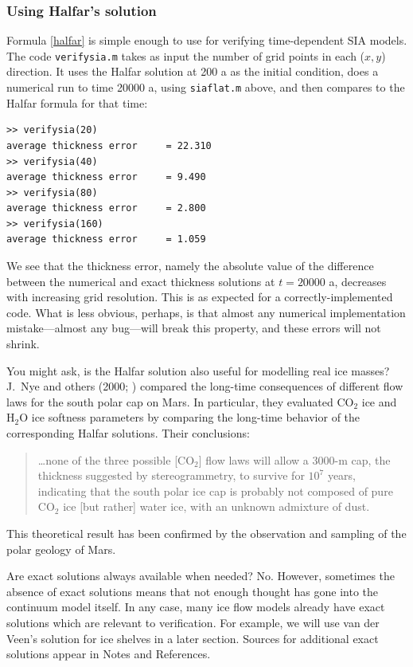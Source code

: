 \documentclass[letterpaper,final,12pt,reqno]{amsart}
\begin{document}
\subsubsection*{Using Halfar's solution}  Formula \eqref{halfar} is simple enough to use for verifying time-dependent SIA models.  The code \texttt{verifysia.m} takes as input the number of grid points in each ($x,y$) direction.  It uses the Halfar solution at 200 a as the initial condition, does a numerical run to time 20000 a, using \texttt{siaflat.m} above, and then compares to the Halfar formula for that time:
\small
\begin{verbatim}
>> verifysia(20)
average thickness error     = 22.310
>> verifysia(40)
average thickness error     = 9.490
>> verifysia(80)
average thickness error     = 2.800
>> verifysia(160)
average thickness error     = 1.059
\end{verbatim}
\normalsize
We see that the thickness error, namely the absolute value of the difference between the numerical and exact thickness solutions at $t=20000$ a, decreases with increasing grid resolution.  This is as expected for a correctly-implemented code.  What is less obvious, perhaps, is that almost any numerical implementation mistake---almost any bug---will break this property, and these errors will not shrink.

You might ask, is the Halfar solution also useful for modelling real ice masses?  J.~Nye and others (2000; \cite{NyeIcarus2000}) compared the long-time consequences of different flow laws for the south polar cap on Mars.  In particular, they evaluated $\text{CO}_2$ ice and $\text{H}_2\text{O}$ ice softness parameters by comparing the long-time behavior of the corresponding Halfar solutions.  Their conclusions:
  \begin{quote}
  \dots none of the three possible [$\text{CO}_2$] flow laws will allow a 3000-m cap, the thickness suggested by stereogrammetry, to survive for $10^7$ years, indicating that the south polar ice cap is probably not composed of pure $\text{CO}_2$ ice [but rather] water ice, with an unknown admixture of dust.
  \end{quote}
This theoretical result has been confirmed by the observation and sampling of the polar geology of Mars.

Are exact solutions always available when needed?  No.  However, sometimes the absence of exact solutions means that not enough thought has gone into the continuum model itself.  In any case, many ice flow models already have exact solutions which are relevant to verification.  For example, we will use van der Veen's solution for ice shelves in a later section.  Sources for additional exact solutions appear in Notes and References.
\end{document}
